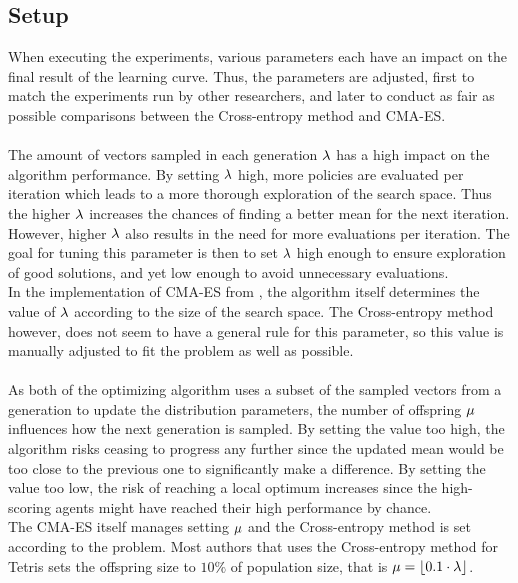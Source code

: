 \subsection{Setup}

When executing the experiments, various parameters each have 
an impact on the final result of the learning curve. Thus, the parameters
are adjusted, first to match the experiments run by other researchers, 
and later to conduct as fair as possible comparisons between 
the Cross-entropy method and CMA-ES.\\
\\
The amount of vectors sampled in each generation $\lambda$
has a high impact on the algorithm performance. By setting $\lambda$
high, more policies are evaluated per iteration which leads to a more thorough 
exploration of the search space. Thus the higher $\lambda$ increases the
chances of finding a better mean for the next iteration.
However, higher $\lambda$ also results in the
need for more evaluations per iteration. The goal for 
tuning this parameter is then
to set $\lambda$ high enough to ensure 
exploration of good solutions, and yet 
low enough to avoid unnecessary evaluations.\\
In the implementation of CMA-ES from \shark , 
the algorithm  itself determines
the value of $\lambda$ according to the 
size of the search space. 
The Cross-entropy method however, does not seem to have a 
general rule for this parameter,
so this value is manually adjusted to fit the 
problem as well as possible.\\
\\
As both of the optimizing algorithm uses a subset of the sampled vectors
from a generation to update the distribution parameters, the number of 
offspring $\mu$ influences how the next generation is sampled.
By setting the value too high, the algorithm risks ceasing to progress any 
further since the updated mean would be too close to the previous one to 
significantly make a difference. By setting the value too low,
the risk of reaching a local optimum increases since the high-scoring agents
might have reached their high performance by chance.\\
The CMA-ES itself manages setting $\mu$ and the Cross-entropy method
is set according to the problem. Most authors that uses the Cross-entropy method for Tetris
sets the offspring size to $10\%$ of population size, that is 
$\mu = \lfloor 0.1 \cdot \lambda \rfloor $.\\
